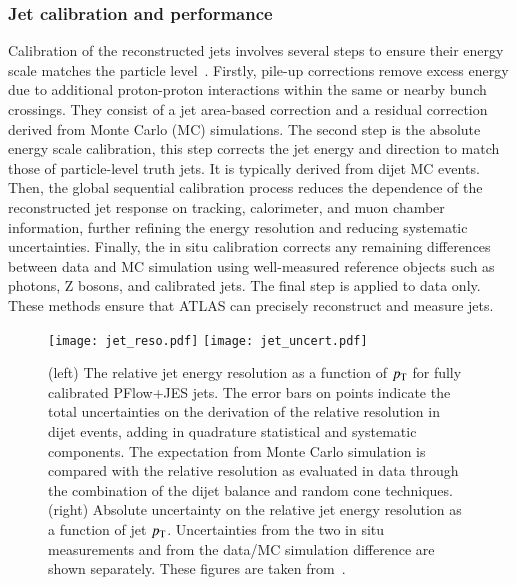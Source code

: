         \subsubsection{Jet calibration and performance}
            Calibration of the reconstructed jets involves several steps to ensure their energy scale matches the particle level~\cite{JETM-2018-05, JETM-2022-01}. 
            Firstly, pile-up corrections remove excess energy due to additional proton-proton interactions within the same or nearby 
            bunch crossings. They consist of a jet area-based correction and a residual correction derived from Monte Carlo (MC) simulations.
            The second step is the absolute energy scale calibration, this step corrects the jet energy and direction to match those of 
            particle-level truth jets. It is typically derived from dijet MC events. Then, the global sequential calibration process 
            reduces the dependence of the reconstructed jet response on tracking, calorimeter, and muon chamber information, further 
            refining the energy resolution and reducing systematic uncertainties. Finally, the in situ calibration corrects any remaining
            differences between data and MC simulation using well-measured reference objects such as photons, Z bosons, and calibrated jets.
            The final step is applied to data only.
            These methods ensure that ATLAS can precisely reconstruct and measure jets.
            \begin{figure}[htbp]
                \centering
                \texttt{[image: jet\_reso.pdf]}
                \texttt{[image: jet\_uncert.pdf]}
                \caption{
                    (left) The relative jet energy resolution as a function of $p_{\text{T}}$ for fully calibrated PFlow+JES jets. 
                    The error bars on points indicate the total uncertainties on the derivation of the relative resolution in dijet events, 
                    adding in quadrature statistical and systematic components. 
                    The expectation from Monte Carlo simulation is compared with the relative resolution as evaluated in data through the combination of the dijet balance and random cone techniques. 
                    (right) Absolute uncertainty on the relative jet energy resolution as a function of jet $p_{\text{T}}$. 
                    Uncertainties from the two in situ measurements and from the data/MC simulation difference are shown separately.
                    These figures are taken from~\cite{JETM-2018-05}.
                }
                \label{fig:jet_reso}
            \end{figure}

